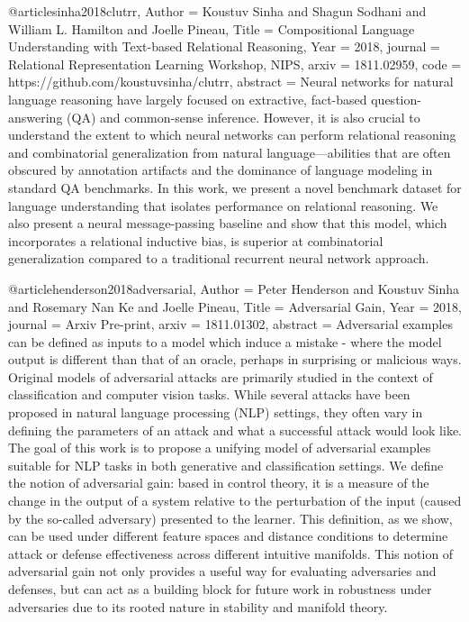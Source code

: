 @article{sinha2018clutrr,
  Author = {Koustuv Sinha and Shagun Sodhani and William L. Hamilton and Joelle Pineau},
  Title = {Compositional Language Understanding with Text-based Relational Reasoning},
  Year = {2018},
  journal = {Relational Representation Learning Workshop, NIPS},
  arxiv = {1811.02959},
  code = {https://github.com/koustuvsinha/clutrr},
  abstract = {Neural networks for natural language reasoning have largely focused on extractive, fact-based question-answering (QA) and common-sense inference. However, it is also crucial to understand the extent to which neural networks can perform relational reasoning and combinatorial generalization from natural language---abilities that are often obscured by annotation artifacts and the dominance of language modeling in standard QA benchmarks. In this work, we present a novel benchmark dataset for language understanding that isolates performance on relational reasoning. We also present a neural message-passing baseline and show that this model, which incorporates a relational inductive bias, is superior at combinatorial generalization compared to a traditional recurrent neural network approach. }
}

@article{henderson2018adversarial,
  Author = {Peter Henderson and Koustuv Sinha and Rosemary Nan Ke and Joelle Pineau},
  Title = {Adversarial Gain},
  Year = {2018},
  journal = {Arxiv Pre-print},
  arxiv = {1811.01302},
  abstract = {Adversarial examples can be defined as inputs to a model which induce a mistake - where the model output is different than that of an oracle, perhaps in surprising or malicious ways. Original models of adversarial attacks are primarily studied in the context of classification and computer vision tasks. While several attacks have been proposed in natural language processing (NLP) settings, they often vary in defining the parameters of an attack and what a successful attack would look like. The goal of this work is to propose a unifying model of adversarial examples suitable for NLP tasks in both generative and classification settings. We define the notion of adversarial gain: based in control theory, it is a measure of the change in the output of a system relative to the perturbation of the input (caused by the so-called adversary) presented to the learner. This definition, as we show, can be used under different feature spaces and distance conditions to determine attack or defense effectiveness across different intuitive manifolds. This notion of adversarial gain not only provides a useful way for evaluating adversaries and defenses, but can act as a building block for future work in robustness under adversaries due to its rooted nature in stability and manifold theory. }
}

